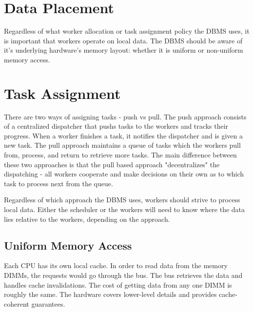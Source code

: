 \documentclass[11pt]{article}
\begin{document}
\section{Data Placement}
Regardless of what worker allocation or task assignment policy the DBMS uses, it is important that 
workers operate on local data. The DBMS should be aware of it's underlying hardware's memory layout: 
whether it is uniform or non-uniform memory access.

\section{Task Assignment}
There are two ways of assigning tasks - push vs pull. The push approach consists of a centralized 
dispatcher that pushs tasks to the workers and tracks their progress. When a worker finishes a task,
it notifies the dispatcher and is given a new task. The pull approach maintains a queue of tasks which 
the workers pull from, process, and return to retrieve more tasks. The main difference between these
two approaches is that the pull based approach "decentralizes" the dispatching - all workers cooperate 
and make decisions on their own as to which task to process next from the queue.

Regardless of which approach the DBMS uses, workers should strive to process local data. Either the scheduler
or the workers will need to know where the data lies relative to the workers, depending on the approach.

\subsection*{Uniform Memory Access}
Each CPU has its own local cache. In order to read data from the memory DIMMs, the requests would go 
through the bus. The bus retrieves the data and handles cache invalidations. The cost of getting 
data from any one DIMM is roughly the same. The hardware covers lower-level details and provides 
cache-coherent guarantees.

\end{document}
